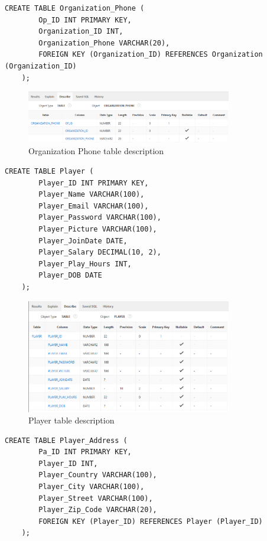 \begin{lstlisting}[caption={Create Organization Phone table}, label={lst:create_organization_phone}]
    CREATE TABLE Organization_Phone (
        Op_ID INT PRIMARY KEY,
        Organization_ID INT,
        Organization_Phone VARCHAR(20),
        FOREIGN KEY (Organization_ID) REFERENCES Organization (Organization_ID)
    );
    \end{lstlisting}
\begin{figure}[H]
    \centering
    \includegraphics[width=0.8\textwidth]{images/TableDesc/ORGANIZATION_PHONE.png}
    \caption{Organization Phone table description}
    \label{fig:organization_phone_table}
\end{figure}
\begin{lstlisting}[caption={Create Player table}, label={lst:create_player}]
    CREATE TABLE Player (
        Player_ID INT PRIMARY KEY,
        Player_Name VARCHAR(100),
        Player_Email VARCHAR(100),
        Player_Password VARCHAR(100),
        Player_Picture VARCHAR(100),
        Player_JoinDate DATE,
        Player_Salary DECIMAL(10, 2),
        Player_Play_Hours INT,
        Player_DOB DATE
    );
    \end{lstlisting}
\begin{figure}[H]
    \centering
    \includegraphics[width=0.8\textwidth]{images/TableDesc/PLAYER.png}
    \caption{Player table description}
    \label{fig:player_table}
\end{figure}
\begin{lstlisting}[caption={Create Player Address table}, label={lst:create_player_address}]
    CREATE TABLE Player_Address (
        Pa_ID INT PRIMARY KEY,
        Player_ID INT,
        Player_Country VARCHAR(100),
        Player_City VARCHAR(100),
        Player_Street VARCHAR(100),
        Player_Zip_Code VARCHAR(20),
        FOREIGN KEY (Player_ID) REFERENCES Player (Player_ID)
    );
    \end{lstlisting}
